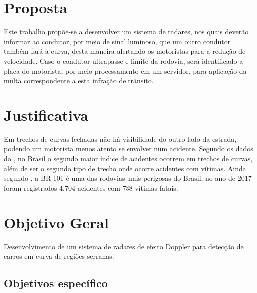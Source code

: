 \section{Proposta}

Este trabalho propõe-se a desenvolver um sistema de radares, nos quais deverão informar ao condutor, por meio de sinal luminoso, que um outro condutor também fará a curva, desta maneira alertando os motoristas para a redução de velocidade. Caso o condutor ultrapasse o limite da rodovia, será identificado a placa do motorista, por meio processamento em um servidor, para aplicação da multa correspondente a esta infração de trânsito.



\section{Justificativa}

Em trechos de curvas fechadas não há visibilidade do outro lado da estrada, podendo um motorista menos atento se envolver num acidente. Segundo os dados do \cite{anuario_rodoviario}, no Brasil o segundo maior índice de acidentes ocorrem em trechos de curvas, além de ser o segundo tipo de trecho onde ocorre acidentes com vítimas. Ainda segundo \cite{anuario_rodoviario}, a BR 101 é uma das rodovias mais perigosas do Brasil, no ano de 2017 foram registrados 4.704 acidentes com 788 vítimas fatais. 

\section{Objetivo Geral}

Desenvolvimento de um sistema de radares de efeito Doppler para detecção de carros em curva de regiões serranas.


\subsection{Objetivos específico}